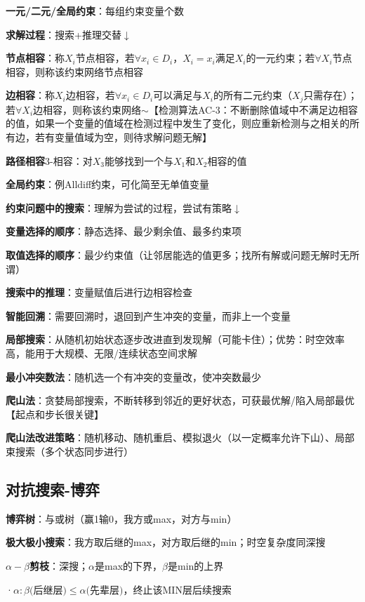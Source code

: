 	\textbf{一元/二元/全局约束}：每组约束变量个数
	
	\textbf{求解过程}：搜索+推理交替$\downarrow$
	
	\textbf{节点相容}：称$X_i$节点相容，若$\forall x_i \in D_i$，$X_i=x_i$满足$X_i$的一元约束；若$\forall X_i$节点相容，则称该约束网络节点相容
	
	\textbf{边相容}：称$X_i$边相容，若$\forall x_i \in D_i$可以满足与$X_i$的所有二元约束（$X_j$只需存在）；若$\forall X_i$边相容，则称该约束网络$\sim$【检测算法AC-3：不断删除值域中不满足边相容的值，如果一个变量的值域在检测过程中发生了变化，则应重新检测与之相关的所有边，若有变量值域为空，则待求解问题无解】
	
	\textbf{路径相容}3-相容：对$X_3$能够找到一个与$X_1$和$X_2$相容的值
	
	\textbf{全局约束}：例Alldiff约束，可化简至无单值变量
	
	\textbf{约束问题中的搜索}：理解为尝试的过程，尝试有策略$\downarrow$
	
	\textbf{变量选择的顺序}：静态选择、最少剩余值、最多约束项
	
	\textbf{取值选择的顺序}：最少约束值（让邻居能选的值更多；找所有解或问题无解时无所谓）
	
	\textbf{搜索中的推理}：变量赋值后进行边相容检查
	
	\textbf{智能回溯}：需要回溯时，退回到产生冲突的变量，而非上一个变量
	
	\textbf{局部搜索}：从随机初始状态逐步改进直到发现解（可能卡住）；优势：时空效率高，能用于大规模、无限/连续状态空间求解
	
	\textbf{最小冲突数法}：随机选一个有冲突的变量改，使冲突数最少
	
	\textbf{爬山法}：贪婪局部搜索，不断转移到邻近的更好状态，可获最优解/陷入局部最优【起点和步长很关键】
	
	\textbf{爬山法改进策略}：随机移动、随机重启、模拟退火（以一定概率允许下山）、局部束搜索（多个状态同步进行）
	
	\subsection*{对抗搜索-博弈}
	
	\textbf{博弈树}：与或树（赢1输0，我方或max，对方与min）
	
	\textbf{极大极小搜索}：我方取后继的max，对方取后继的min；时空复杂度同深搜
	
	\textbf{$\alpha-\beta$剪枝}：深搜；$\alpha$是max的下界，$\beta$是min的上界
	
	·$\alpha : \beta \text{(后继层)} \leq \alpha \text{(先辈层)，}\text{终止该} \mathrm{MIN} \text{层后续搜索}$
	
